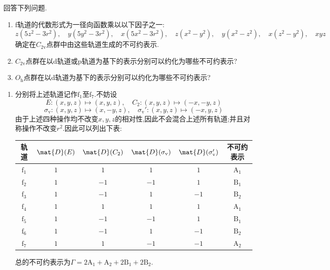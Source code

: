 \documentclass{ctexart}
\begin{document}
\begin{homework}[10.]
    回答下列问题.
    \begin{enumerate}[label=\tbf{(\alph*)}]
        \item f轨道的代数形式为一径向函数乘以以下因子之一:
        \[z(5z^2-3r^2),\quad y(5y^2-3r^2),\quad x(5x^2-3r^2),\quad z(x^2-y^2),\quad y(x^2-z^2),\quad x(z^2-y^2),\quad xyz\]
        确定在$C_{2\text{v}}$点群中由这些轨道生成的不可约表示.
        \item $C_{2\text{v}}$点群在以d轨道或p轨道为基下的表示分别可以约化为哪些不可约表示?
        \item $O_\text{h}$点群在以d轨道为基下的表示分别可以约化为哪些不可约表示?
    \end{enumerate}
\end{homework}
\begin{solution}
\begin{enumerate}[label=\tbf{(\alph*)}]
    \item 分别将上述轨道记作$\text{f}_1$至$\text{f}_7$.不妨设
    \[E:(x,y,z)\mapsto(x,y,z),\quad C_2:(x,y,z)\mapsto(-x,-y,z)\]
    \[\sigma_\text{v}:(x,y,z)\mapsto(x,-y,z),\quad\sigma_\text{v}':(x,y,z)\mapsto(-x,y,z)\]
    由于上述四种操作均不改变$x,y,z$的相对性,因此不会混合上述所有轨道;并且对称操作不改变$r^2$.因此可以列出下表:
    \begin{table}[H]\centering
        \begin{tabular}{|c|c|c|c|c|c|}\hline
            轨道 & $\mat{D}(E)$ & $\mat{D}(C_2)$ & $\mat{D}(\sigma_\text{v})$ & $\mat{D}(\sigma_\text{v}')$ & 不可约表示 \\\hline
            $\text{f}_1$ & $1$ & $1$ & $1$ & $1$ & $\text{A}_1$ \\\hline
            $\text{f}_2$ & $1$ & $-1$ & $-1$ & $1$ & $\text{B}_1$ \\\hline
            $\text{f}_3$ & $1$ & $-1$ & $1$ & $-1$ & $\text{B}_2$ \\\hline
            $\text{f}_4$ & $1$ & $1$ & $1$ & $1$ & $\text{A}_1$ \\\hline
            $\text{f}_5$ & $1$ & $-1$ & $-1$ & $1$ & $\text{B}_1$ \\\hline
            $\text{f}_6$ & $1$ & $-1$ & $1$ & $-1$ & $\text{B}_2$ \\\hline
            $\text{f}_7$ & $1$ & $1$ & $-1$ & $-1$ & $\text{A}_2$ \\\hline
        \end{tabular}
    \end{table}
    总的不可约表示为$\Gamma=2\text{A}_1+\text{A}_2+2\text{B}_1+2\text{B}_2$.

\end{enumerate}
\end{solution}
\end{document}
